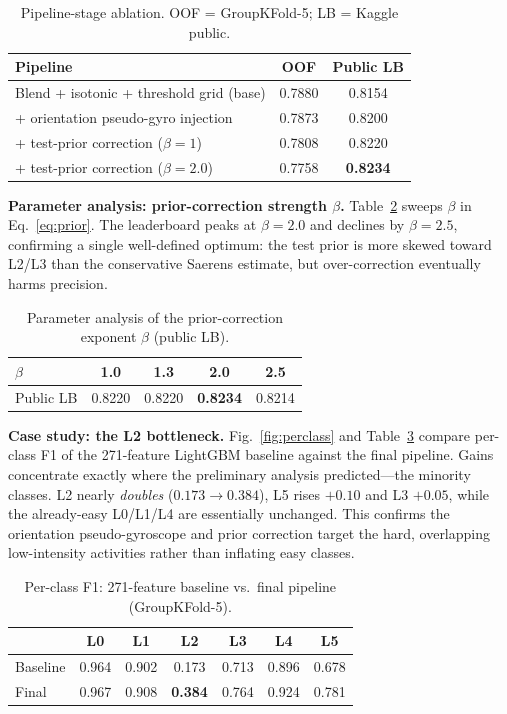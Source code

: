 \documentclass[conference]{IEEEtran}
\begin{document}
\begin{table}[t]
\caption{Pipeline-stage ablation. OOF = GroupKFold-5; LB = Kaggle public.}
\label{tab:stageabl}
\centering
\begin{tabular}{l c c}
\hline
\textbf{Pipeline} & \textbf{OOF} & \textbf{Public LB}\\
\hline
Blend + isotonic + threshold grid (base) & 0.7880 & 0.8154 \\
\;\; + orientation pseudo-gyro injection & 0.7873 & 0.8200 \\
\;\; + test-prior correction ($\beta{=}1$) & 0.7808 & 0.8220 \\
\;\; + test-prior correction ($\beta{=}2.0$) & 0.7758 & \textbf{0.8234} \\
\hline
\end{tabular}
\end{table}

\textbf{Parameter analysis: prior-correction strength $\beta$.} Table~\ref{tab:beta} sweeps $\beta$ in
Eq.~\eqref{eq:prior}. The leaderboard peaks at $\beta=2.0$ and declines by $\beta=2.5$, confirming a single
well-defined optimum: the test prior is more skewed toward L2/L3 than the conservative Saerens estimate, but
over-correction eventually harms precision.

\begin{table}[t]
\caption{Parameter analysis of the prior-correction exponent $\beta$ (public LB).}
\label{tab:beta}
\centering
\begin{tabular}{l c c c c}
\hline
$\beta$ & 1.0 & 1.3 & \textbf{2.0} & 2.5 \\
\hline
Public LB & 0.8220 & 0.8220 & \textbf{0.8234} & 0.8214 \\
\hline
\end{tabular}
\end{table}

\textbf{Case study: the L2 bottleneck.} Fig.~\ref{fig:perclass} and Table~\ref{tab:perclass} compare per-class
F1 of the 271-feature LightGBM baseline against the final pipeline. Gains concentrate exactly where the preliminary analysis
predicted---the minority classes. L2 nearly \emph{doubles} ($0.173\!\rightarrow\!0.384$), L5 rises $+0.10$ and
L3 $+0.05$, while the already-easy L0/L1/L4 are essentially unchanged. This confirms the orientation
pseudo-gyroscope and prior correction target the hard, overlapping low-intensity activities rather than
inflating easy classes.

\begin{table}[t]
\caption{Per-class F1: 271-feature baseline vs.\ final pipeline (GroupKFold-5).}
\label{tab:perclass}
\centering
\begin{tabular}{l c c c c c c}
\hline
 & L0 & L1 & L2 & L3 & L4 & L5 \\
\hline
Baseline & 0.964 & 0.902 & 0.173 & 0.713 & 0.896 & 0.678 \\
Final & 0.967 & 0.908 & \textbf{0.384} & 0.764 & 0.924 & 0.781 \\
\hline
\end{tabular}
\end{table}
\end{document}

